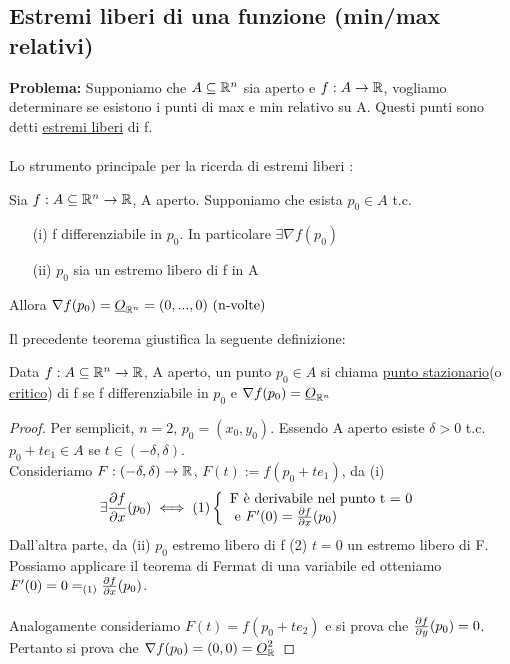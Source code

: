 \subsection{Estremi liberi di una funzione (min/max relativi)}
\textbf{Problema:} Supponiamo che $A \subseteq \mathbb{R}^n$ sia aperto e $f: A \to \mathbb{R}$, vogliamo determinare se esistono i punti di max e min
relativo su A. Questi punti sono detti \underline{estremi liberi} di f. \\\\
Lo strumento principale per la ricerda di estremi liberi \ace: 
\begin{theorem}[Fermat]
  Sia $f: A \subseteq \mathbb{R}^n \to \mathbb{R}$, A aperto. Supponiamo che esista $p_0 \in A$ t.c. 
  \begin{enumerate}
    \item[(i)] f differenziabile in $p_0$. In particolare $\exists \nabla f(p_0)$
    \item[(ii)] $p_0$ sia un estremo libero di f in A
  \end{enumerate}
  Allora $\nabla f(p_0) = \underline{O}_{\mathbb{R}^n} = (0,...,0) \text{ (n-volte)}$
\end{theorem}
Il precedente teorema giustifica la seguente definizione:
\begin{definition}
  Data $f: A \subseteq \mathbb{R}^n \to \mathbb{R}$, A aperto, un punto $p_0\in A$ si chiama \underline{punto stazionario}(o \underline{critico}) di f se f \ace differenziabile
  in $p_0$ e $\nabla f(p_0) = \underline{O}_{\mathbb{R}^n}$
  \begin{proof}
    Per semplicit\aca, $n = 2$, $p_0 = (x_0,y_0)$. Essendo A aperto esiste $\delta > 0$ t.c. $p_0+te_1 \in A$ se $t \in (-\delta,\delta)$. \\
    Consideriamo $F:(-\delta,\delta)\to\mathbb{R}$, $F(t) := f(p_0+te_1)$, da (i) 
    $$\exists\frac{\partial f}{\partial x}(p_0) \iff (1) \left\{\begin{array}{l}
      \text{F \`e derivabile nel punto t = 0} \\
      \text{ e } F'(0) = \frac{\partial f}{\partial x}(p_0) \\
    \end{array}\right.$$
    Dall'altra parte, da (ii) $p_0$ estremo libero di f (2) $t=0$ \ace un estremo libero di F. \\
    Possiamo applicare il teorema di Fermat di una variabile ed otteniamo $F'(0) = 0 =_{(1)} \frac{\partial f}{\partial x}(p_0)$. \\\\
    Analogamente consideriamo $F(t) = f(p_0+te_2)$ e si prova che $\frac{\partial f}{\partial y}(p_0)=0$. \\
    Pertanto si prova che $\nabla f(p_0) = (0,0) = \underline{O}_{\mathbb{R}}^2$
  \end{proof}
\end{definition}
